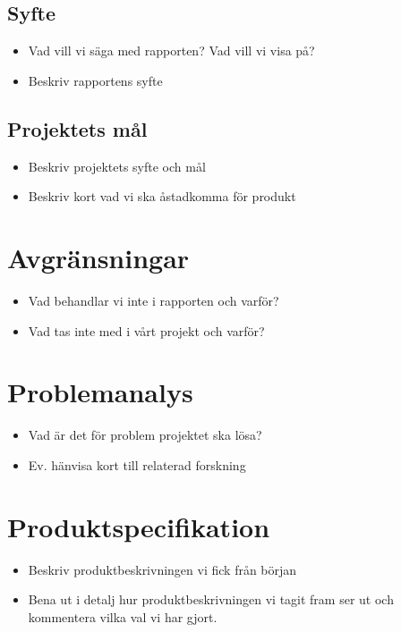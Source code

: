 \documentclass{article}
\begin{document}
\subsection{Syfte}
\begin{itemize}
\item Vad vill vi säga med rapporten? Vad vill vi visa på?
\item Beskriv rapportens syfte
\end{itemize}


\subsection{Projektets mål}
\begin{itemize}
\item Beskriv projektets syfte och mål 
\item Beskriv kort vad vi ska åstadkomma för produkt
\end{itemize}

\section{Avgränsningar}
\begin{itemize}
\item Vad behandlar vi inte i rapporten och varför?
\item Vad tas inte med i vårt projekt och varför?
\end{itemize}

\section{Problemanalys}
\begin{itemize}
\item Vad är det för problem projektet ska lösa?
\item Ev. hänvisa kort till relaterad forskning
\end{itemize}

\section{Produktspecifikation}
\begin{itemize}
\item Beskriv produktbeskrivningen vi fick från början
\item Bena ut i detalj hur produktbeskrivningen vi tagit fram ser ut och kommentera vilka val vi har gjort.
\end{itemize}
\end{document}
